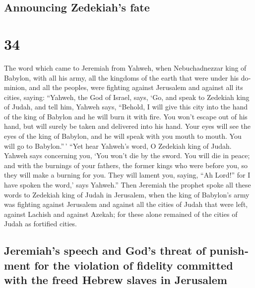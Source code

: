 \begin{paracol}{2}
\switchcolumn
\begin{otherlanguage}{english}

\hypertarget{announcing-zedekiahs-fate}{%
\subsection{Announcing Zedekiah's
fate}\label{announcing-zedekiahs-fate}}

\hypertarget{section-67}{%
\section{34}\label{section-67}}

 The word which came to Jeremiah from Yahweh, when
Nebuchadnezzar king of Babylon, with all his army, all the kingdoms of
the earth that were under his dominion, and all the peoples, were
fighting against Jerusalem and against all its cities, saying:
 ``Yahweh, the God of Israel, says, `Go, and speak to
Zedekiah king of Judah, and tell him, Yahweh says, ``Behold, I will give
this city into the hand of the king of Babylon and he will burn it with
fire.  You won't escape out of his hand, but will surely
be taken and delivered into his hand. Your eyes will see the eyes of the
king of Babylon, and he will speak with you mouth to mouth. You will go
to Babylon.''\,'  ``Yet hear Yahweh's word, O Zedekiah
king of Judah. Yahweh says concerning you, `You won't die by the sword.
 You will die in peace; and with the burnings of your
fathers, the former kings who were before you, so they will make a
burning for you. They will lament you, saying, ``Ah Lord!'' for I have
spoken the word,' says Yahweh.''  Then Jeremiah the
prophet spoke all these words to Zedekiah king of Judah in Jerusalem,
 when the king of Babylon's army was fighting against
Jerusalem and against all the cities of Judah that were left, against
Lachish and against Azekah; for these alone remained of the cities of
Judah as fortified cities.

\hypertarget{jeremiahs-speech-and-gods-threat-of-punishment-for-the-violation-of-fidelity-committed-with-the-freed-hebrew-slaves-in-jerusalem}{%
\subsection{Jeremiah's speech and God's threat of punishment for the
violation of fidelity committed with the freed Hebrew slaves in
Jerusalem}\label{jeremiahs-speech-and-gods-threat-of-punishment-for-the-violation-of-fidelity-committed-with-the-freed-hebrew-slaves-in-jerusalem}}


\end{otherlanguage}
\end{paracol}
